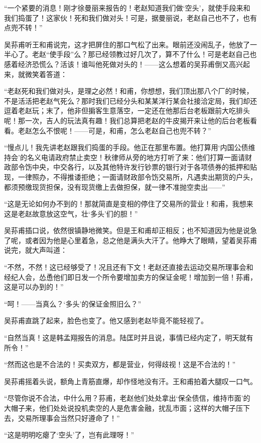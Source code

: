 \par “一个紧要的消息！刚才徐曼丽来报告的！老赵知道我们做‘空头’，就使手段来和我们捣蛋了！这家伙！死和我们做对头！可是，据曼丽说，老赵自己也不了，也有点兜不转！”
\par 吴荪甫听王和甫说完，这才把屏住的那口气松了出来。眼前还没闹乱子，他放了一半心了。老赵“使手段”么？那已经领教过好几次了，算不了什么！可是老赵自己也感着经济恐慌么？活该！谁叫他死做对头的！——这么想着的吴荪甫倒又高兴起来，就微笑着答道：
\par “老赵死和我们做对头，是理之必然！和甫，你想想，我们顶出那八个厂的时候，不是活活把老赵气死么？那时我们已经分头和某某洋行某会社接洽定局，我们却还逗着老赵玩；末了，他非但掮客生意落空，一定还在他那后台老板跟前大吃排头呢！那一次，吉人的玩法真有趣！我们总算把老赵的牛皮揭开来让他的后台老板看看。老赵怎么不恨呢！——可是，和甫，怎么老赵自己也兜不转？”
\par “慢点儿！我先讲老赵跟我们捣蛋的手段。他正在那里布置。他打算用‘内国公债维持会’的名义电请政府禁止卖空！秋律师从旁的地方打听了来：他们打算一面请财政部令饬中央，中交各行，以及其他特许发行钞票的银行对于各项债券的抵押和贴现，一律照办，不得推诿拒绝；一面请财政部令饬交易所，凡遇卖出期货的户头，都须预缴现货担保，没有现货缴上去做担保，就一律不准抛空卖出——”
\par “这是无论如何办不到的！那就简直是变相的停住了交易所的营业！和甫，我想来这是老赵故意放这空气，壮‘多头’们的胆！”
\par 吴荪甫插口说，依然很镇静地微笑。但是王和甫却正相反；也不知道因为他是说急了呢，或者因为他是心里着急，总之他是满头大汗了。他睁大了眼睛，望着吴荪甫说完，就大声叫道：
\par “不然，不然！这已经够受了！况且还有下文！老赵还直接去运动交易所理事会和经纪人会，怂恿他们即日发一个所令要增加卖方的保证金呢！增加到一倍！荪甫，这是可以办到的！”
\par “呵！——当真么？‘多头’的保证金照旧么？”
\par 吴荪甫直跳了起来，脸色也变了。他又感到老赵毕竟不能轻视了。
\par “自然当真！这是韩孟翔报告的消息。陆匡时并且说，事情已经内定了，明天就有所令！”
\par “然而这也是不合法的！买卖双方，都是营业，何得歧视！这是不合法的！”
\par 吴荪甫摇着头说，额角上青筋直爆，却作怪地没有汗。王和甫拍着大腿叹一口气。
\par “尽管你说不合法，中什么用？荪甫，老赵他们处处拿出‘保全债信，维持市面’的大帽子来，他们处处说投机卖空的人是危害金融，扰乱市面；这样的大帽子压下去，交易所理事会当然只好遵命了！”
\par “这是明明吃瘪了‘空头’了，岂有此理呀！”
